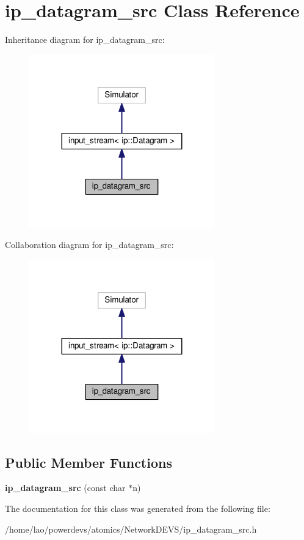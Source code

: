 \hypertarget{classip__datagram__src}{}\section{ip\+\_\+datagram\+\_\+src Class Reference}
\label{classip__datagram__src}


Inheritance diagram for ip\+\_\+datagram\+\_\+src\+:\nopagebreak
\begin{figure}[H]
\begin{center}
\leavevmode
\includegraphics[width=227pt]{classip__datagram__src__inherit__graph}
\end{center}
\end{figure}


Collaboration diagram for ip\+\_\+datagram\+\_\+src\+:\nopagebreak
\begin{figure}[H]
\begin{center}
\leavevmode
\includegraphics[width=227pt]{classip__datagram__src__coll__graph}
\end{center}
\end{figure}
\subsection*{Public Member Functions}
\begin{DoxyCompactItemize}
\item 
{\bfseries ip\+\_\+datagram\+\_\+src} (const char $\ast$n)\hypertarget{classip__datagram__src_a06b73f2700abc04cf41be7e0872e134e}{}\label{classip__datagram__src_a06b73f2700abc04cf41be7e0872e134e}

\end{DoxyCompactItemize}


The documentation for this class was generated from the following file\+:\begin{DoxyCompactItemize}
\item 
/home/lao/powerdevs/atomics/\+Network\+D\+E\+V\+S/ip\+\_\+datagram\+\_\+src.\+h\end{DoxyCompactItemize}
